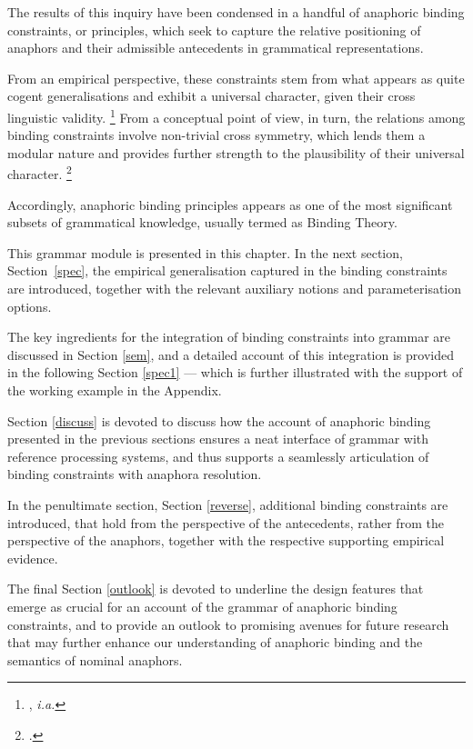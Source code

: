\documentclass[output=paper
	        ,collection
	        ,collectionchapter
 	        ,biblatex
                ,babelshorthands
                ,newtxmath
                ,draftmode
                ,colorlinks, citecolor=brown
]{langscibook}
\begin{document}
The results of this inquiry have been condensed in a handful of anaphoric 
binding constraints, or principles, which seek to capture the relative positioning of anaphors and their 
admissible antecedents in grammatical representations. 

From an empirical perspective, these constraints stem
from what appears as quite cogent generalisations and exhibit a universal
character, given their cross linguistic validity.%
\footnote{
\citep{branco:livro00}, \em{i.a.}
}
From a conceptual point of view, in turn, the relations among binding
constraints involve non-trivial cross symmetry, which lends them a modular nature
and provides further strength to the plausibility of their universal character.%
 \footnote{
\citep{branco:2005}.
}

Accordingly, anaphoric binding principles appears as one of
the most significant subsets of grammatical knowledge, usually termed as Binding Theory.

This grammar module is presented in this chapter. In the next section, Section~\ref{spec},
the empirical generalisation captured in the binding constraints are introduced, together
with the relevant auxiliary notions and parameterisation options.

The key ingredients for the integration of binding constraints into grammar
are discussed in Section \ref{sem}, and a detailed account of this integration is provided
in the following Section \ref{spec1} --- which is further illustrated with the support of
the working example in the Appendix.

Section \ref{discuss} is devoted to discuss how
the account of anaphoric binding presented in the previous sections ensures a neat interface of grammar with reference processing
systems, and thus supports a seamlessly articulation of binding constraints
with anaphora resolution.

In the penultimate section, Section \ref{reverse}, additional binding constraints are introduced,
that hold from the perspective of the antecedents, rather from the perspective of the anaphors,
together with the respective supporting empirical evidence.

The final Section \ref{outlook} is devoted to underline the design features
that emerge as crucial for an account of the grammar of anaphoric
binding constraints, and to provide an outlook to promising avenues for future
research that may further enhance our understanding of anaphoric binding and the semantics
of nominal anaphors.
\end{document}
